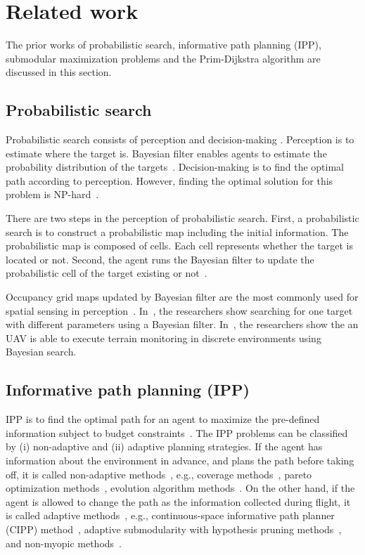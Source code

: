 \chapter{Related work}
The prior works of probabilistic search, informative path planning (IPP), submodular maximization problems and the Prim-Dijkstra algorithm are discussed in this section.

\section{Probabilistic search}

Probabilistic search consists of perception and decision-making \cite{stone1976theory}.
Perception is to estimate where the target is. Bayesian filter enables agents to estimate the probability distribution of the targets~\cite{bourgault2003coordinated}.
Decision-making is to find the optimal path according to perception.
However, finding the optimal solution for this problem is NP-hard~\cite{trummel1986complexity}.

There are two steps in the perception of probabilistic search.
First, a probabilistic search is to construct a probabilistic map including the initial information.
The probabilistic map is composed of cells. Each cell represents whether the target is located or not.
Second, the agent runs the Bayesian filter to update the probabilistic cell of the target existing or not~\cite{chung2007decision}\cite{chung2011analysis}.

Occupancy grid maps updated by Bayesian filter are the most commonly used for spatial sensing in perception~\cite{elfes1989using}.
In~\cite{chung2011analysis}\cite{tseng2017near}, the researchers show searching for one target with different parameters
using a Bayesian filter.
In~\cite{popovic2020informative}, the researchers show the an UAV is able to execute terrain monitoring in discrete environments using Bayesian search.




\section{Informative path planning (IPP)}
IPP is to find the optimal path for an agent to maximize the pre-defined information subject to budget constraints~\cite{lau2008discounted}.
The IPP problems can be classified by (i) non-adaptive and (ii) adaptive planning strategies.
If the agent has information about the environment in advance, and plans the path before taking off, it is called non-adaptive methods~\cite{besada2010evolutionary}, e.g., coverage methods~\cite{galceran2013survey}\cite{torres2016coverage}, pareto optimization methods~\cite{qian2017subset}, evolution algorithm methods~\cite{bian2020efficient}.
On the other hand, if the agent is allowed to change the path as the information collected during flight, it is called adaptive methods~\cite{nikolos2003evolutionary}, e.g., continuous-space informative path planner (CIPP) method~\cite{hitz2017adaptive}, adaptive submodularity with hypothesis pruning methods~\cite{javdani2013efficient}, and non-myopic methods~\cite{singh2009nonmyopic}.

